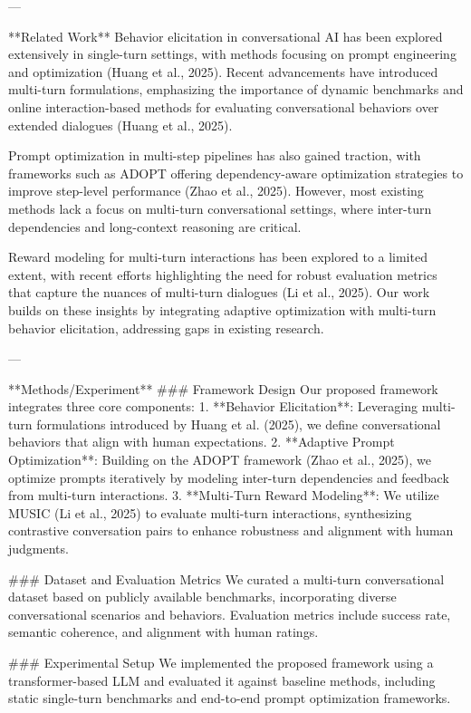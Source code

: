 ---

**Related Work**  
Behavior elicitation in conversational AI has been explored extensively in single-turn settings, with methods focusing on prompt engineering and optimization (Huang et al., 2025). Recent advancements have introduced multi-turn formulations, emphasizing the importance of dynamic benchmarks and online interaction-based methods for evaluating conversational behaviors over extended dialogues (Huang et al., 2025).  

Prompt optimization in multi-step pipelines has also gained traction, with frameworks such as ADOPT offering dependency-aware optimization strategies to improve step-level performance (Zhao et al., 2025). However, most existing methods lack a focus on multi-turn conversational settings, where inter-turn dependencies and long-context reasoning are critical.  

Reward modeling for multi-turn interactions has been explored to a limited extent, with recent efforts highlighting the need for robust evaluation metrics that capture the nuances of multi-turn dialogues (Li et al., 2025). Our work builds on these insights by integrating adaptive optimization with multi-turn behavior elicitation, addressing gaps in existing research.  

---

**Methods/Experiment**  
### Framework Design  
Our proposed framework integrates three core components:  
1. **Behavior Elicitation**: Leveraging multi-turn formulations introduced by Huang et al. (2025), we define conversational behaviors that align with human expectations.  
2. **Adaptive Prompt Optimization**: Building on the ADOPT framework (Zhao et al., 2025), we optimize prompts iteratively by modeling inter-turn dependencies and feedback from multi-turn interactions.  
3. **Multi-Turn Reward Modeling**: We utilize MUSIC (Li et al., 2025) to evaluate multi-turn interactions, synthesizing contrastive conversation pairs to enhance robustness and alignment with human judgments.  

### Dataset and Evaluation Metrics  
We curated a multi-turn conversational dataset based on publicly available benchmarks, incorporating diverse conversational scenarios and behaviors. Evaluation metrics include success rate, semantic coherence, and alignment with human ratings.  

### Experimental Setup  
We implemented the proposed framework using a transformer-based LLM and evaluated it against baseline methods, including static single-turn benchmarks and end-to-end prompt optimization frameworks.  

